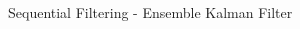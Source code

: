 \documentclass[aspectratio=169]{beamer} %
\begin{document}
\begin{frame}{Sequential Filtering - Ensemble Kalman Filter}
\begin{columns}
\begin{column}{0.4\textwidth}
\begin{figure}

\end{figure}
\end{column}
\end{columns}
\end{frame}
\end{document}
